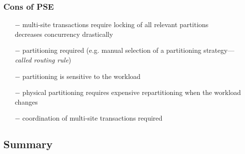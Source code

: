 \begin{frame}
	\frametitle{Cons of PSE}
	
	\begin{itemize}
		\item[$-$]	multi-site transactions require locking of all relevant partitions \\ \bm{$\rightarrow$} decreases concurrency drastically
		\item[$-$]	partitioning required (e.g. manual selection of a partitioning strategy---\textit{called routing rule})
		\item[$-$]	partitioning is sensitive to the workload
		\item[$-$]	physical partitioning requires expensive repartitioning when the workload changes
		\item[$-$]	coordination of multi-site transactions required
	\end{itemize}
\end{frame}

\subsection[Summary]{Summary}

